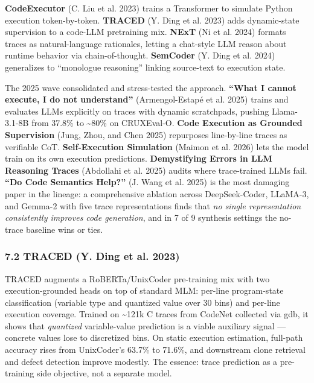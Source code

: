\documentclass{article}
\begin{document}
\textbf{CodeExecutor} (C. Liu et al. 2023) trains a Transformer to
simulate Python execution token-by-token. \textbf{TRACED} (Y. Ding et
al. 2023) adds dynamic-state supervision to a code-LLM pretraining mix.
\textbf{NExT} (Ni et al. 2024) formats traces as natural-language
rationales, letting a chat-style LLM reason about runtime behavior via
chain-of-thought. \textbf{SemCoder} (Y. Ding et al. 2024) generalizes to
``monologue reasoning'' linking source-text to execution state.

The 2025 wave consolidated and stress-tested the approach.
\textbf{``What I cannot execute, I do not understand''} (Armengol-Estapé
et al. 2025) trains and evaluates LLMs explicitly on traces with dynamic
scratchpads, pushing Llama-3.1-8B from 37.8\% to \textasciitilde80\% on
CRUXEval-O. \textbf{Code Execution as Grounded Supervision} (Jung, Zhou,
and Chen 2025) repurposes line-by-line traces as verifiable CoT.
\textbf{Self-Execution Simulation} (Maimon et al. 2026) lets the model
train on its own execution predictions. \textbf{Demystifying Errors in
LLM Reasoning Traces} (Abdollahi et al. 2025) audits where trace-trained
LLMs fail. \textbf{``Do Code Semantics Help?''} (J. Wang et al. 2025) is
the most damaging paper in the lineage: a comprehensive ablation across
DeepSeek-Coder, LLaMA-3, and Gemma-2 with five trace representations
finds that \emph{no single representation consistently improves code
generation}, and in 7 of 9 synthesis settings the no-trace baseline wins
or ties.

\hypertarget{traced-arxiv2306_07487}{%
\subsubsection{7.2 TRACED (Y. Ding et al.
2023)}\label{traced-arxiv2306_07487}}

TRACED augments a RoBERTa/UnixCoder pre-training mix with two
execution-grounded heads on top of standard MLM: per-line program-state
classification (variable type and quantized value over 30 bins) and
per-line execution coverage. Trained on \textasciitilde121k C traces
from CodeNet collected via gdb, it shows that \emph{quantized}
variable-value prediction is a viable auxiliary signal --- concrete
values lose to discretized bins. On static execution estimation,
full-path accuracy rises from UnixCoder's 63.7\% to 71.6\%, and
downstream clone retrieval and defect detection improve modestly. The
essence: trace prediction as a pre-training side objective, not a
separate model.
\end{document}
